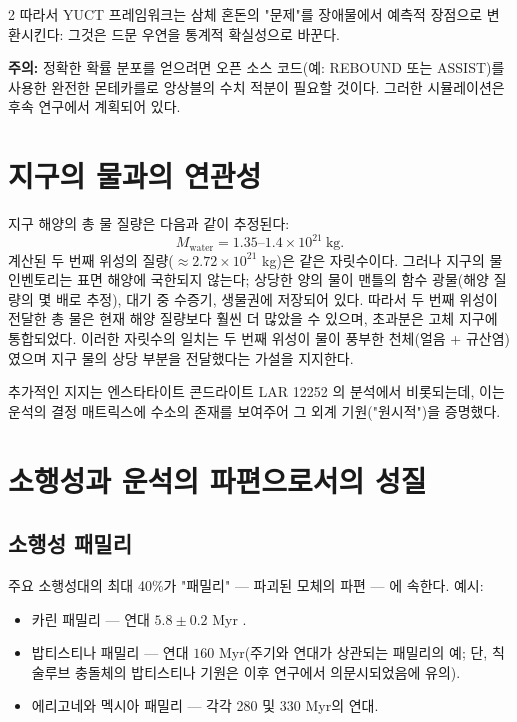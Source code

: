 \documentclass[12pt,a4paper]{article}
\begin{document}
\begin{multicols}{2}
		따라서 YUCT 프레임워크는 삼체 혼돈의 "문제"를 장애물에서 예측적 장점으로 변환시킨다: 그것은 드문 우연을 통계적 확실성으로 바꾼다.
		
		\vspace{0.2cm}
		\noindent
		\textbf{주의:} 정확한 확률 분포를 얻으려면 오픈 소스 코드(예: REBOUND 또는 ASSIST)를 사용한 완전한 몬테카를로 앙상블의 수치 적분이 필요할 것이다. 그러한 시뮬레이션은 후속 연구에서 계획되어 있다.
		
		\section{지구의 물과의 연관성}
		지구 해양의 총 물 질량은 다음과 같이 추정된다:
		\[
		M_{\text{water}} = 1.35\text{–}1.4 \times 10^{21}\ \text{kg}.
		\]
		계산된 두 번째 위성의 질량(\(\approx 2.72 \times 10^{21}\) kg)은 같은 자릿수이다. 그러나 지구의 물 인벤토리는 표면 해양에 국한되지 않는다; 상당한 양의 물이 맨틀의 함수 광물(해양 질량의 몇 배로 추정), 대기 중 수증기, 생물권에 저장되어 있다. 따라서 두 번째 위성이 전달한 총 물은 현재 해양 질량보다 훨씬 더 많았을 수 있으며, 초과분은 고체 지구에 통합되었다. 이러한 자릿수의 일치는 두 번째 위성이 물이 풍부한 천체(얼음 + 규산염)였으며 지구 물의 상당 부분을 전달했다는 가설을 지지한다.
		
		추가적인 지지는 엔스타타이트 콘드라이트 LAR 12252 \cite{Gardiner2025}의 분석에서 비롯되는데, 이는 운석의 결정 매트릭스에 수소의 존재를 보여주어 그 외계 기원("원시적")을 증명했다.
		
		\section{소행성과 운석의 파편으로서의 성질}
		\subsection{소행성 패밀리}
		주요 소행성대의 최대 40\%가 "패밀리" — 파괴된 모체의 파편 — 에 속한다. 예시:
		\begin{itemize}
			\item 카린 패밀리 — 연대 \(5.8 \pm 0.2\) Myr \cite{Nesvorny2002}.
			\item 밥티스티나 패밀리 — 연대 \(160\) Myr(주기와 연대가 상관되는 패밀리의 예; 단, 칙술루브 충돌체의 밥티스티나 기원은 이후 연구에서 의문시되었음에 유의).
			\item 에리고네와 멕시아 패밀리 — 각각 280 및 330 Myr의 연대.
		\end{itemize}
		

\end{multicols}
\end{document}
